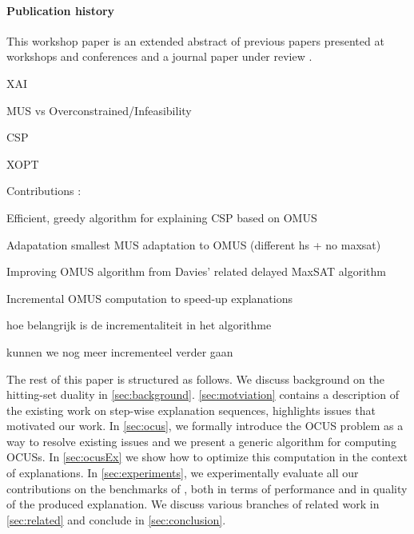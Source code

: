 {{\paragraph*{Publication history} This workshop paper is an extended abstract of previous papers presented at workshops and conferences \cite{claesuser,DBLP:conf/bnaic/ClaesBCGG19,ecai/BogaertsGCG20} and a journal paper under review \cite{bogaerts2020framework}.
}

\begin{compactenum}
    \item XAI
    \item MUS vs Overconstrained/Infeasibility
    \item CSP
    \item XOPT
\end{compactenum}

Contributions : 
\begin{compactenum}
    \item Efficient, greedy algorithm for explaining CSP based on OMUS 
    \item Adapatation smallest MUS adaptation to OMUS (different hs + no maxsat) 
    \item Improving OMUS algorithm from Davies' related delayed MaxSAT algorithm 
    \item Incremental OMUS computation to speed-up explanations
    \begin{compactitem}
        \item hoe belangrijk is de incrementaliteit in het algorithme
        \item kunnen  we nog meer incrementeel verder gaan
    \end{compactitem}
\end{compactenum}
}


The rest of this paper is structured as follows.
We discuss background on the hitting-set duality in \cref{sec:background}. \cref{sec:motviation} contains a description of the existing work on step-wise explanation sequences, highlights issues that motivated our work. 
In \cref{sec:ocus}, we
 formally introduce the OCUS problem as a way to resolve existing issues and  
 we present a generic \hitsetbased algorithm for computing OCUSs. In \cref{sec:ocusEx} we show how to optimize this computation in the context of explanations. 
In \cref{sec:experiments}, we experimentally evaluate all our contributions on the benchmarks of \citet{ecai/BogaertsGCG20}, both in  terms of performance and in quality of the produced explanation. 
We discuss various branches of related work in \cref{sec:related} and conclude in \cref{sec:conclusion}.


